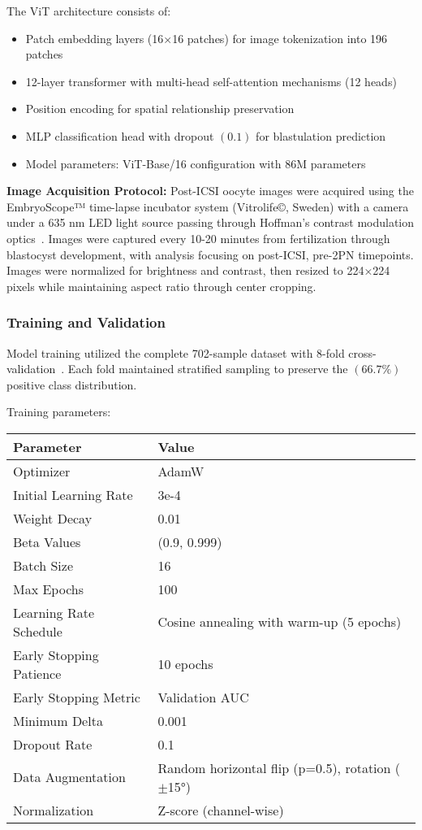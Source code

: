 \documentclass[pdflatex,sn-basic]{sn-jnl}%
\begin{document}
The ViT architecture consists of:
\begin{itemize}
\item Patch embedding layers (16×16 patches) for image tokenization into 196 patches
\item 12-layer transformer with multi-head self-attention mechanisms (12 heads)
\item Position encoding for spatial relationship preservation
\item MLP classification head with dropout $(0.1)$ for blastulation prediction
\item Model parameters: ViT-Base/16 configuration with 86M parameters
\end{itemize}

\textbf{Image Acquisition Protocol:} Post-ICSI oocyte images were acquired using the EmbryoScope™ time-lapse incubator system (Vitrolife©, Sweden) with a camera under a 635 nm LED light source passing through Hoffman's contrast modulation optics~\cite{gomez2022timelapse}. Images were captured every 10-20 minutes from fertilization through blastocyst development, with analysis focusing on post-ICSI, pre-2PN timepoints. Images were normalized for brightness and contrast, then resized to 224×224 pixels while maintaining aspect ratio through center cropping.

\subsubsection{Training and Validation}

Model training utilized the complete 702-sample dataset with 8-fold cross-validation~\cite{varoquaux2022machine}. Each fold maintained stratified sampling to preserve the $(66.7\%)$ positive class distribution.

Training parameters:

\begin{center}
\small
\begin{tabular}{ll}
\hline
\textbf{Parameter} & \textbf{Value} \\
\hline
Optimizer & AdamW \\
Initial Learning Rate & 3e-4 \\
Weight Decay & 0.01 \\
Beta Values & (0.9, 0.999) \\
Batch Size & 16 \\
Max Epochs & 100 \\
Learning Rate Schedule & Cosine annealing with warm-up (5 epochs) \\
Early Stopping Patience & 10 epochs \\
Early Stopping Metric & Validation AUC \\
Minimum Delta & 0.001 \\
Dropout Rate & 0.1 \\
Data Augmentation & Random horizontal flip (p=0.5), rotation ($\pm$15°) \\
Normalization & Z-score (channel-wise) \\
\hline
\end{tabular}
\end{center}
\end{document}

